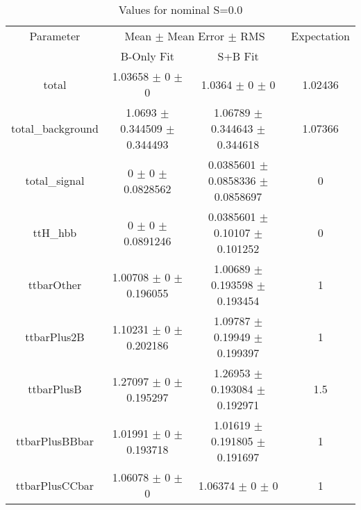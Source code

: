 \begin{table}
\centering
\caption{Values for nominal S=0.0}
\begin{tabular}{cccc}
\toprule
Parameter & \multicolumn{2}{c}{Mean $\pm$ Mean Error $\pm$ RMS} & Expectation\\
 & B-Only Fit & S+B Fit & \\
\midrule
total & \num{1.03658} $\pm$ \num{0} $\pm$ \num{0} & \num{1.0364} $\pm$ \num{0} $\pm$ \num{0} & \num{1.02436}\\
total\_background & \num{1.0693} $\pm$ \num{0.344509} $\pm$ \num{0.344493} & \num{1.06789} $\pm$ \num{0.344643} $\pm$ \num{0.344618} & \num{1.07366}\\
total\_signal & \num{0} $\pm$ \num{0} $\pm$ \num{0.0828562} & \num{0.0385601} $\pm$ \num{0.0858336} $\pm$ \num{0.0858697} & \num{0}\\
ttH\_hbb & \num{0} $\pm$ \num{0} $\pm$ \num{0.0891246} & \num{0.0385601} $\pm$ \num{0.10107} $\pm$ \num{0.101252} & \num{0}\\
ttbarOther & \num{1.00708} $\pm$ \num{0} $\pm$ \num{0.196055} & \num{1.00689} $\pm$ \num{0.193598} $\pm$ \num{0.193454} & \num{1}\\
ttbarPlus2B & \num{1.10231} $\pm$ \num{0} $\pm$ \num{0.202186} & \num{1.09787} $\pm$ \num{0.19949} $\pm$ \num{0.199397} & \num{1}\\
ttbarPlusB & \num{1.27097} $\pm$ \num{0} $\pm$ \num{0.195297} & \num{1.26953} $\pm$ \num{0.193084} $\pm$ \num{0.192971} & \num{1.5}\\
ttbarPlusBBbar & \num{1.01991} $\pm$ \num{0} $\pm$ \num{0.193718} & \num{1.01619} $\pm$ \num{0.191805} $\pm$ \num{0.191697} & \num{1}\\
ttbarPlusCCbar & \num{1.06078} $\pm$ \num{0} $\pm$ \num{0} & \num{1.06374} $\pm$ \num{0} $\pm$ \num{0} & \num{1}\\
\bottomrule
\end{tabular}
\end{table}